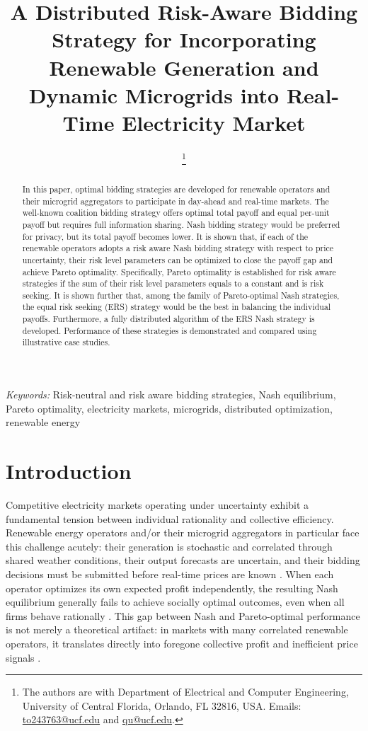 \documentclass[journal]{IEEEtran}
\title{A Distributed Risk-Aware Bidding Strategy for Incorporating Renewable Generation and Dynamic Microgrids into Real-Time Electricity Market}
\author{\IEEEauthorblockN{Tommy Truong and Zhihua Qu
}
\thanks{The authors are with Department of Electrical and Computer Engineering, University of Central Florida, Orlando, FL 32816, USA. Emails: \href{mailto:to243763@ucf.edu}{to243763@ucf.edu} and 
\href{mailto:qu@ucf.edu}{qu@ucf.edu}.}}
\begin{document}
\maketitle

\begin{abstract}
In this paper, optimal bidding strategies are developed for renewable operators and their microgrid aggregators to participate in day-ahead and real-time markets. The well-known coalition bidding strategy offers optimal total payoff and equal per-unit payoff but requires full information sharing. Nash bidding strategy would be preferred for privacy, but its total payoff becomes lower. It is shown that, if each of the renewable operators adopts a risk aware Nash bidding strategy with respect to price uncertainty, their risk level parameters can be optimized to close the payoff gap and achieve Pareto optimality. Specifically, Pareto optimality is established for risk aware strategies if the sum of their risk level parameters equals to a constant and is risk seeking. It is shown further that, among the family of Pareto-optimal Nash strategies, the equal risk seeking (ERS) strategy would be the best in balancing the individual payoffs. Furthermore, a fully distributed algorithm of the ERS Nash strategy is developed. Performance of these strategies is demonstrated and compared using illustrative case studies. 
\end{abstract}

{\it Keywords:} Risk-neutral and risk aware bidding strategies, Nash equilibrium, Pareto optimality, electricity markets, microgrids, distributed optimization, renewable energy

\section{Introduction}

Competitive electricity markets operating under uncertainty exhibit a fundamental tension between individual rationality and collective efficiency. Renewable energy operators and/or their microgrid aggregators in particular face this challenge acutely: their generation is stochastic and correlated through shared weather conditions, their output forecasts are uncertain, and their bidding decisions must be submitted before real-time prices are known \cite{dvorkin2020chance, wong2007pricing, mieth2020distribution, 7930435}. When each operator optimizes its own expected profit independently, the resulting Nash equilibrium generally fails to achieve socially optimal outcomes,
even when all firms behave rationally \cite{zhang2016competition, lee2015rational, HobbsPang2007}.
This gap between Nash and Pareto-optimal performance is not merely a theoretical artifact: in markets with many correlated renewable operators, it translates directly into foregone collective profit and inefficient price signals \cite{asplund2002risk, wambach1999bertrand}.
\end{document}
